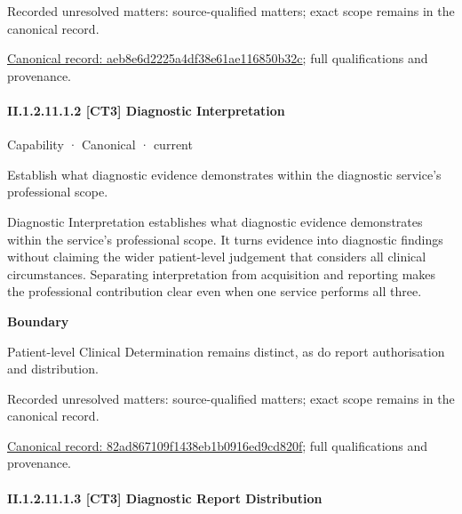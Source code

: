 {\small Recorded unresolved matters: source-qualified matters; exact scope remains in the canonical record.}\par
{\footnotesize \href{../../../../continuum/strategy/capability/aeb8e6d2225a4df38e61ae116850b32c.md}{Canonical record: aeb8e6d2225a4df38e61ae116850b32c}; full qualifications and provenance.}\par
\paragraph*{II.1.2.11.1.2 [CT3] Diagnostic Interpretation}
\label{navigation:II.1.2.11.1.2}

\label{element:82ad867109f1438eb1b0916ed9cd820f}
{\small Capability · Canonical · current}\par

Establish what diagnostic evidence demonstrates within the diagnostic service’s professional scope.



Diagnostic Interpretation establishes what diagnostic evidence demonstrates within the service's professional scope. It turns evidence into diagnostic findings without claiming the wider patient-level judgement that considers all clinical circumstances. Separating interpretation from acquisition and reporting makes the professional contribution clear even when one service performs all three.



\textbf{Boundary}



Patient-level Clinical Determination remains distinct, as do report authorisation and distribution.


{\small Recorded unresolved matters: source-qualified matters; exact scope remains in the canonical record.}\par
{\footnotesize \href{../../../../continuum/strategy/capability/82ad867109f1438eb1b0916ed9cd820f.md}{Canonical record: 82ad867109f1438eb1b0916ed9cd820f}; full qualifications and provenance.}\par
\paragraph*{II.1.2.11.1.3 [CT3] Diagnostic Report Distribution}
\label{navigation:II.1.2.11.1.3}

